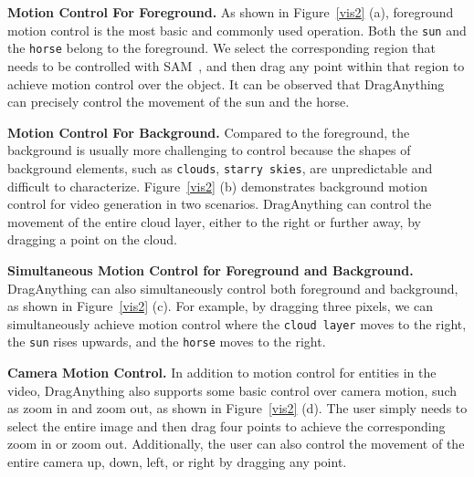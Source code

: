 \documentclass[runningheads]{llncs}
\newcommand{\ours}{\textup{DragAnything}\xspace}
\begin{document}
\textbf{Motion Control For Foreground.}
As shown in Figure~\ref{vis2} (a), 
%
foreground motion control is the most basic and commonly used operation.
%
Both the \texttt{sun} and the \texttt{horse} belong to the foreground. 
%
We select the corresponding region that needs to be controlled with SAM~\cite{kirillov2023segment}, and then drag any point within that region to achieve motion control over the object.
%
It can be observed that \ours can precisely control the movement of the sun and the horse.

\textbf{Motion Control For Background.}
%
Compared to the foreground, the background is usually more challenging to control because the shapes of background elements, such as \texttt{clouds}, \texttt{starry skies}, are unpredictable and difficult to characterize.
%
Figure~\ref{vis2} (b) demonstrates background motion control for video generation in two scenarios.
%
\ours can control the movement of the entire cloud layer, either to the right or further away, by dragging a point on the cloud.

\textbf{Simultaneous Motion Control for Foreground and Background.}
%
\ours can also simultaneously control both foreground and background, as shown in Figure~\ref{vis2} (c).
%
For example, by dragging three pixels, we can simultaneously achieve motion control where the \texttt{cloud layer} moves to the right, the \texttt{sun} rises upwards, and the \texttt{horse} moves to the right.
%

%
\textbf{Camera Motion Control.}
In addition to motion control for entities in the video, \ours also supports some basic control over camera motion, such as zoom in and zoom out, as shown in Figure~\ref{vis2} (d).
%
The user simply needs to select the entire image and then drag four points to achieve the corresponding zoom in or zoom out. Additionally, the user can also control the movement of the entire camera up, down, left, or right by dragging any point.
\end{document}
